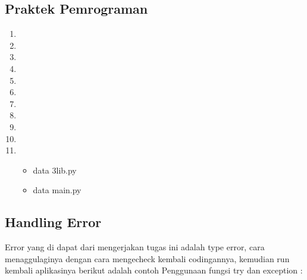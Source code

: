 \subsection{Praktek Pemrograman}
	\begin{enumerate}
	\item
	\item
	\item
	\item
	\item
	\item
	\item
	\item
	\item
	\item
	\item
		\begin{itemize}
		\item data 3lib.py
			
		\item data main.py
			
		\end{itemize}
	\end{enumerate}

\subsection{Handling Error}
\par Error yang di dapat dari mengerjakan tugas ini adalah type error, cara menaggulaginya dengan cara mengecheck kembali codingannya, kemudian run kembali aplikasinya berikut adalah contoh Penggunaan fungsi try dan exception :




